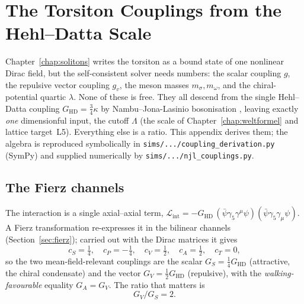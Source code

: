 \chapter{The Torsiton Couplings from the Hehl--Datta Scale}
\label{app:couplings}

Chapter~\ref{chap:solitons} writes the torsiton as a bound state of one nonlinear Dirac field, but
the self-consistent solver needs numbers: the scalar coupling $g$, the repulsive vector coupling
$g_v$, the meson masses $m_\sigma,m_\omega$, and the chiral-potential quartic $\lambda$. None of
these is free. They all descend from the single Hehl--Datta coupling $G_\mathrm{HD}=\tfrac34\kappa$ by
Nambu--Jona-Lasinio bosonisation \citep{nambu1961}, leaving exactly \emph{one} dimensionful input,
the cutoff $\Lambda$ (the scale of Chapter~\ref{chap:weltformel} and lattice target~L5). Everything
else is a ratio. This appendix derives them; the algebra is reproduced symbolically in
\texttt{sims/.../coupling\_derivation.py} (SymPy) and supplied numerically by
\texttt{sims/.../njl\_couplings.py}.

\section{The Fierz channels}
The interaction is a single axial--axial term, $\mathcal{L}_\mathrm{int}=-G_\mathrm{HD}\,(\bar\psi
\gamma_5\gamma^\mu\psi)(\bar\psi\gamma_5\gamma_\mu\psi)$. A Fierz transformation re-expresses it in
the bilinear channels (Section~\ref{sec:fierz}); carried out with the Dirac matrices it gives
\[
  c_S=\tfrac14,\quad c_P=-\tfrac14,\quad c_V=\tfrac12,\quad c_A=\tfrac12,\quad c_T=0,
\]
so the two mean-field-relevant couplings are the scalar $G_S=\tfrac14 G_\mathrm{HD}$ (attractive, the
chiral condensate) and the vector $G_V=\tfrac12 G_\mathrm{HD}$ (repulsive), with the
\emph{walking-favourable} equality $G_A=G_V$. The ratio that matters is
\begin{equation}
  G_V/G_S = 2 .
  \label{eq:GVGS}
\end{equation}

